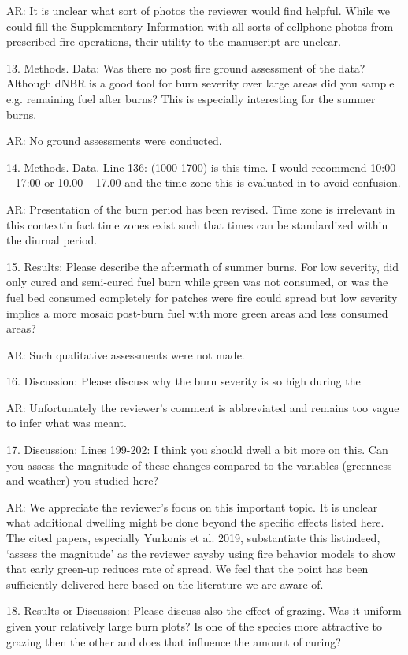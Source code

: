 \documentclass[parskip=half, american]{scrartcl}
\newcommand{\AR}[1]
	{\color{PineGreen}AR: #1\color{black} \par }
\begin{document}
\AR{ It is unclear what sort of photos the reviewer would find helpful. 
While we could fill the Supplementary Information with all sorts of cellphone photos from prescribed fire operations, their utility to the manuscript are unclear. }

13.	Methods. Data: Was there no post fire ground assessment of the data? Although dNBR is a good tool for burn severity over large areas did you sample e.g. remaining fuel after burns? This is especially interesting for the summer burns. 

\AR{No ground assessments were conducted.  }

14.	Methods. Data. Line 136: (1000-1700) is this time. I would recommend 10:00 – 17:00 or 10.00 – 17.00 and the time zone this is evaluated in to avoid confusion. 

\AR{Presentation of the burn period has been revised. 
Time zone is irrelevant in this context\textemdash in fact time zones exist such that times can be standardized within the diurnal period.  }

15.	Results: Please describe the aftermath of summer burns. For low severity, did only cured and semi-cured fuel burn while green was not consumed, or was the fuel bed consumed completely for patches were fire could spread but low severity implies a more mosaic post-burn fuel with more green areas and less consumed areas?

\AR{Such qualitative assessments were not made.  }

16.	Discussion: Please discuss why the burn severity is so high during the 

\AR{ Unfortunately the reviewer's comment is abbreviated and remains too vague to infer what was meant. }

17.	Discussion: Lines 199-202: I think you should dwell a bit more on this. Can you assess the magnitude of these changes compared to the variables (greenness and weather) you studied here?

\AR{We appreciate the reviewer's focus on this important topic. 
It is unclear what additional dwelling might be done beyond the specific effects listed here. 
The cited papers, especially Yurkonis et al. 2019, substantiate this list\textemdash indeed, `assess the magnitude' as the reviewer says\textemdash  by using fire behavior models to show that early green-up reduces rate of spread. 
We feel that the point has been sufficiently delivered here based on the literature we are aware of.  }

18.	Results or Discussion: Please discuss also the effect of grazing. Was it uniform given your relatively large burn plots? Is one of the species more attractive to grazing then the other and does that influence the amount of curing?
\end{document}
